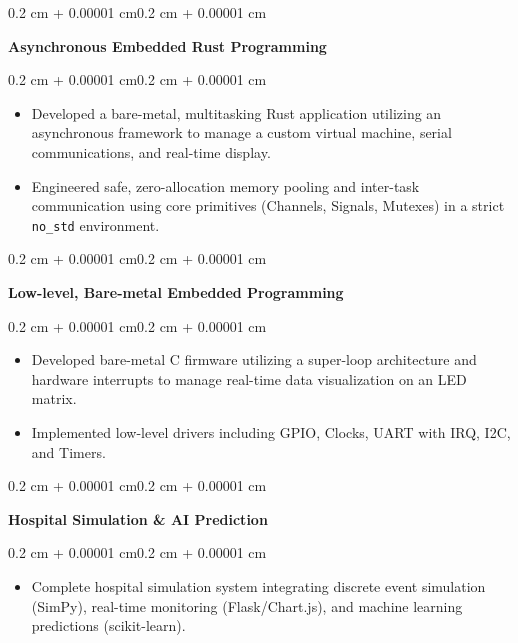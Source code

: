\documentclass[10pt, a4paper]{article}
\newenvironment{highlights}{
    \begin{itemize}[
        topsep=0.10 cm,
        parsep=0.10 cm,
        partopsep=0pt,
        itemsep=0pt,
        leftmargin=0.4 cm + 10pt
    ]
}{
    \end{itemize}
}
\newenvironment{onecolentry}{
    \begin{adjustwidth}{0.2 cm + 0.00001 cm}{0.2 cm + 0.00001 cm}
}{
    \end{adjustwidth}
}
\begin{document}
        \begin{onecolentry}
            \textbf{Asynchronous Embedded Rust Programming}
        \end{onecolentry}
        \vspace{0.05 cm}
        \begin{onecolentry}
            \begin{highlights}
                \item Developed a bare-metal, multitasking Rust application
                    utilizing an asynchronous framework to manage a custom
                    virtual machine, serial communications, and real-time
                    display.
                \item Engineered safe, zero-allocation memory pooling and
                    inter-task communication using core primitives (Channels,
                    Signals, Mutexes) in a strict \texttt{no\_std} environment.
            \end{highlights}
        \end{onecolentry}
        \vspace{0.2 cm}

        \begin{onecolentry}
            \textbf{Low-level, Bare-metal Embedded Programming}
        \end{onecolentry}
        \vspace{0.05 cm}
        \begin{onecolentry}
            \begin{highlights}
                \item Developed bare-metal C firmware utilizing a super-loop
                    architecture and hardware interrupts to manage real-time
                    data visualization on an LED matrix.
                \item Implemented low-level drivers including GPIO, Clocks, UART
                    with IRQ, I2C, and Timers.
            \end{highlights}
        \end{onecolentry}
        \vspace{0.2 cm}

        \begin{onecolentry}
            \textbf{Hospital Simulation \& AI Prediction}
        \end{onecolentry}
        \vspace{0.05 cm}
        \begin{onecolentry}
            \begin{highlights}
                \item Complete hospital simulation system integrating discrete
                    event simulation (SimPy), real-time monitoring
                    (Flask/Chart.js), and machine learning predictions
                    (scikit-learn).
            \end{highlights}
        \end{onecolentry}
        \vspace{0.2 cm}
\end{document}
